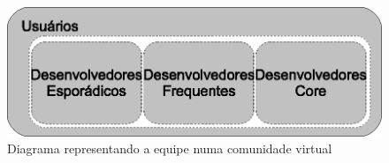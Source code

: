 \begin{figure}
 \centering
 \includegraphics{../../doc/diagramas/equipe.eps}
 \caption[Equipe numa comunidade virtual]{Diagrama representando a equipe numa comunidade virtual \cite{introducaoslca}}
 \label{fig:equipe}
\end{figure}
